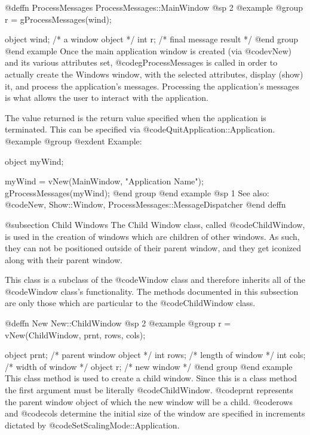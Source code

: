 @deffn {ProcessMessages} ProcessMessages::MainWindow
@sp 2
@example
@group
r = gProcessMessages(wind);

object  wind;   /*  a window object       */
int     r;      /*  final message result  */
@end group
@end example
Once the main application window is created (via @code{vNew}) and
its various attributes set, @code{gProcessMessages} is called in order
to actually create the Windows window, with the selected attributes,
display (show) it, and process the application's messages.  Processing
the application's messages is what allows the user to interact with the
application.

The value returned is the return value specified when the application is
terminated.  This can be specified via @code{QuitApplication::Application}.
@example
@group
@exdent Example:

object  myWind;

myWind = vNew(MainWindow, "Application Name");
gProcessMessages(myWind);
@end group
@end example
@sp 1
See also:  @code{New, Show::Window, ProcessMessages::MessageDispatcher}
@end deffn











@subsection Child Windows
The Child Window class, called @code{ChildWindow}, is used in the creation
of windows which are children of other windows.  As such, they can not
be positioned outside of their parent window, and they get iconized along
with their parent window.


This class is a subclass of the @code{Window} class and therefore
inherits all of the @code{Window} class's functionality.  The methods
documented in this subsection are only those which are particular
to the @code{ChildWindow} class.





@deffn {New} New::ChildWindow
@sp 2
@example
@group
r = vNew(ChildWindow, prnt, rows, cols);

object  prnt;   /*  parent window object  */
int     rows;   /*  length of window      */
int     cols;   /*  width of window       */
object  r;      /*  new window            */
@end group
@end example
This class method is used to create a child window.
Since this is a class method the first argument must be literally
@code{ChildWindow}.  @code{prnt} represents the parent window
object of which the new window will be a child.  @code{rows} and
@code{cols} determine the initial size of the window are specified
in increments dictated by @code{SetScalingMode::Application}.

